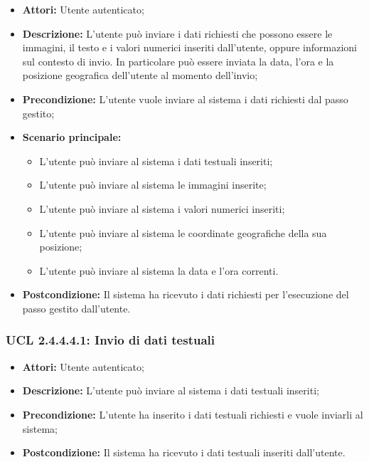 \begin{itemize}
\item \textbf{Attori:} Utente autenticato;
\item \textbf{Descrizione:} L'utente può inviare i dati richiesti che possono essere le immagini, il testo e i valori numerici inseriti dall'utente, oppure informazioni sul contesto di invio. In particolare può essere inviata la data, l'ora e la posizione geografica dell'utente al momento dell'invio;
\item \textbf{Precondizione:} L'utente vuole inviare al sistema i dati richiesti dal passo gestito;
\item \textbf{Scenario principale:}
\begin{itemize}
\item L'utente può inviare al sistema i dati testuali inseriti;
\item L'utente può inviare al sistema le immagini inserite;
\item L'utente può inviare al sistema i valori numerici inseriti;
\item L'utente può inviare al sistema le coordinate geografiche della sua posizione;
\item L'utente può inviare al sistema la data e l'ora correnti.
\end{itemize}
\item \textbf{Postcondizione:} Il sistema ha ricevuto i dati richiesti per l'esecuzione del passo gestito dall'utente.
\end{itemize}

\hypertarget{L2.4.4.4.1}{}
\subsubsection{UCL 2.4.4.4.1: Invio di dati testuali}
\begin{itemize}
\item \textbf{Attori:} Utente autenticato;
\item \textbf{Descrizione:} L'utente può inviare al sistema i dati testuali inseriti;
\item \textbf{Precondizione:} L'utente ha inserito i dati testuali richiesti e vuole inviarli al sistema;
\item \textbf{Postcondizione:} Il sistema ha ricevuto i dati testuali inseriti dall'utente.
\end{itemize}

